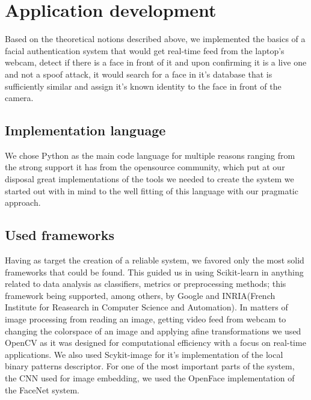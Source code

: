 \chapter{Application development}
Based on the theoretical notions described above, we implemented the basics of a facial authentication system that would get real-time feed from the laptop's webcam, detect if there is a face in front of it and upon confirming it is a live one and not a spoof attack, it would search for a face in it's database that is sufficiently similar and assign it's known identity to the face in front of the camera.	

\section{Implementation language}
We chose Python as the main code language for multiple reasons ranging from the strong support it has from the opensource community, which put at our disposal great implementations of the tools we needed to create the system we started out with in mind to the well fitting of this language with our pragmatic approach.
\section{Used frameworks}
Having as target the creation of a reliable system, we favored only the most solid frameworks that could be found. This guided us in using Scikit-learn \cite{scikit-learn} in anything related to data analysis as classifiers, metrics or preprocessing methods; this framework being supported, among others, by Google and INRIA(French Institute for Reasearch in Computer Science and Automation). In matters of image processing from reading an image, getting video feed from webcam to changing the colorspace of an image and applying afine transformations we used OpenCV \cite{opencv_library} as it was designed for computational efficiency with a focus on real-time applications. We also used Scykit-image \cite{scikit-image} for it's implementation of the local binary patterns descriptor. For one of the most important parts of the system, the CNN used for image embedding, we used the OpenFace \cite{amos2016openface} implementation of the FaceNet \cite{SchroffKP15} system.
